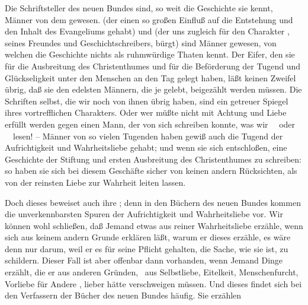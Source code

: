 \begin{aufza}
\item Die Schriftsteller des neuen Bundes sind, so weit die Geschichte sie kennt, Männer von dem  gewesen.  (der einen so großen Einfluß auf die Entstehung und den Inhalt des Evangeliums  gehabt) und  (der uns zugleich für den Charakter , seines Freundes und Geschichtschreibers, bürgt) sind Männer gewesen, von welchen die Geschichte nichts als ruhmwürdige Thaten kennt. Der Eifer, den sie für die Ausbreitung des Christenthumes und für die Beförderung der Tugend und Glückseligkeit unter den Menschen an den Tag gelegt haben, läßt keinen Zweifel übrig, daß sie den edelsten Männern, die je gelebt, beigezählt werden müssen. Die Schriften selbst, die wir noch von ihnen übrig haben, sind ein getreuer Spiegel ihres vortrefflichen Charakters. Oder wer müßte nicht mit Achtung und Liebe erfüllt werden gegen einen Mann, der von sich schreiben konnte, was wir \zB\ \ oder \ \uaO\ lesen! -- Männer von so vielen Tugenden haben gewiß auch die Tugend der Aufrichtigkeit und Wahrheitsliebe gehabt; und wenn sie sich entschloßen, eine Geschichte der Stiftung und ersten Ausbreitung des Christenthumes zu schreiben: so haben sie sich bei diesem Geschäfte sicher von keinen andern Rücksichten, als von der reinsten Liebe zur Wahrheit leiten lassen.
\item Doch dieses beweiset auch ihre ; denn in den Büchern des neuen Bundes kommen die unverkennbarsten Spuren der Aufrichtigkeit und Wahrheitsliebe vor. Wir können wohl schließen, daß Jemand etwas aus reiner Wahrheitsliebe erzähle, wenn sich aus keinem andern Grunde erklären läßt, warum er dieses erzähle, es wäre denn nur darum, weil er es für seine Pflicht gehalten, die Sache, wie sie ist, zu schildern. Dieser Fall ist aber offenbar dann vorhanden, wenn Jemand Dinge erzählt, die er aus anderen Gründen, \zB\ aus Selbstliebe, Eitelkeit, Menschenfurcht, Vorliebe für Andere \udgl , lieber hätte verschweigen müssen. Und dieses findet sich bei den Verfassern der Bücher des neuen Bundes häufig. Sie erzählen
\begin{aufzb}

\end{aufzb}
\end{aufza}
